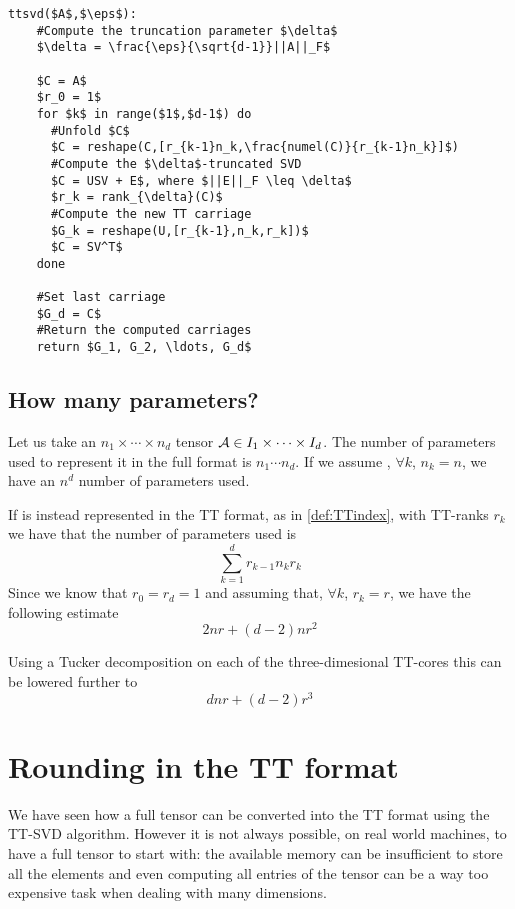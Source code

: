 \begin{lstlisting}[title=TT-SVD compression algorithm]
  ttsvd($A$,$\eps$):
    #Compute the truncation parameter $\delta$
    $\delta = \frac{\eps}{\sqrt{d-1}}||A||_F$
  
    $C = A$
    $r_0 = 1$
    for $k$ in range($1$,$d-1$) do
      #Unfold $C$
      $C = reshape(C,[r_{k-1}n_k,\frac{numel(C)}{r_{k-1}n_k}]$)
      #Compute the $\delta$-truncated SVD
      $C = USV + E$, where $||E||_F \leq \delta$
      $r_k = rank_{\delta}(C)$
      #Compute the new TT carriage
      $G_k = reshape(U,[r_{k-1},n_k,r_k])$
      $C = SV^T$
    done
    
    #Set last carriage
    $G_d = C$
    #Return the computed carriages
    return $G_1, G_2, \ldots, G_d$
\end{lstlisting}

\subsection{How many parameters?}
Let us take an $n_1 \times \cdots \times n_d$ tensor $\mathcal{A} \in I_1 \times \cdots \times I_d$. The number of parameters used to represent it in the full format is $n_1 \cdots n_d$. If we assume , $\forall k$, $n_k  = n$, we have an $n^d$ number of parameters used.

If \A is instead represented in the TT format, as in \ref{def:TTindex}, with TT-ranks $r_k$ we have that the number of parameters used is
\begin{equation*}
  \sum_{k=1}^d r_{k-1} n_k r_k
\end{equation*}
Since we know that $r_0 = r_d = 1$ and assuming that, $\forall k$, $r_k = r$, we have the following estimate
\begin{equation*}
  2nr + (d-2)nr^2
\end{equation*}

Using a Tucker decomposition on each of the three-dimesional TT-cores this can be lowered further to
\begin{equation*}
  dnr + (d-2)r^3
\end{equation*}

\section{Rounding in the TT format}
We have seen how a full tensor can be converted into the TT format using the TT-SVD algorithm. However it is not always possible, on real world machines, to have a full tensor to start with: the available memory can be insufficient to store all the elements and even computing all entries of the tensor can be a way too expensive task when dealing with many dimensions.


